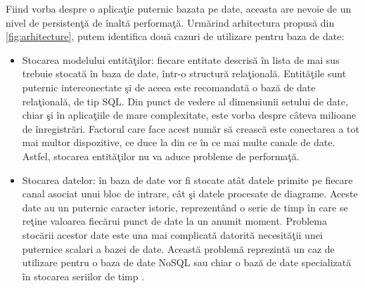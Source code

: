 Fiind vorba despre o aplicaţie puternic bazata pe date, aceasta are nevoie de un nivel de persistenţă de înaltă performaţă. 
Urmărind arhitectura propusă din \cref{fig:arhitecture}, putem identifica două cazuri de utilizare pentru baza de date: 
\begin{itemize}
	\item Stocarea modelului entităţilor: fiecare entitate descrisă în lista de mai sus trebuie stocată în baza de date, într-o structură relaţională. Entităţile sunt puternic interconectate şi de aceea este recomandată o bază de date relaţională, de tip SQL. 
	Din punct de vedere al dimensiunii setului de date, chiar şi în aplicaţiile de mare complexitate, este vorba despre câteva milioane de înregistrări. Factorul care face acest număr să crească este conectarea a tot mai multor dispozitive, ce duce la din ce în ce mai multe canale de date. Astfel, stocarea entităţilor nu va aduce probleme de performaţă. 
	\item Stocarea datelor: în baza de date vor fi stocate atât datele primite pe fiecare canal asociat unui bloc de intrare, cât şi datele procesate de diagrame. Aceste date au un puternic caracter istoric, reprezentând o serie de timp în care se reţine  valoarea fiecărui punct de date la un anumit moment. Problema stocării acestor date este una mai complicată datorită necesităţii unei puternice scalari a bazei de date. Această problemă reprezintă un caz de utilizare pentru o baza de date NoSQL sau chiar o bază de date specializată în stocarea seriilor de timp \autocite{openTSDB}.  
\end{itemize}

